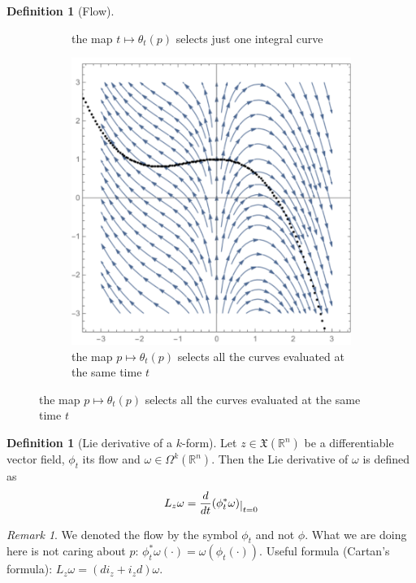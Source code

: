 \documentclass[a4paper,11pt,titlepage, article, oneside]{memoir}
\numberwithin{equation}{section}
\theoremstyle{definition}
\newtheorem{definition}[theorem]{Definition}
\theoremstyle{remark}
\newtheorem{remark}[theorem]{Remark}
\newcommand{\rfield}{\mathbb{R}}
\newcommand{\restrict}[2]{{#1}\raisebox{-.5ex}{$|$}_{#2}}
\begin{document}
\begin{definition}[Flow]
\begin{figure}[H]
\begin{subfigure}{.48\textwidth}
     \caption{the map $t \mapsto \theta_t(p)$ selects just one integral curve} \label{Fig:integralcurve_1}
\end{subfigure}
\begin{subfigure}{.48\textwidth}
     \centering
     \vspace{0.4em}
     \includegraphics[width=0.95\linewidth]{Images/integralcurve_2.pdf}
     \caption{the map $p \mapsto \theta_t(p)$ selects all the curves evaluated at the same time $t$} \label{Fig:integralcurve_2}
\end{subfigure}
\end{figure}
\end{definition}

\begin{definition}[Lie derivative of a $k$-form]
  Let $z \in \mathfrak{X}(\rfield^n)$ be a differentiable vector field, $\phi_t$ its flow and $\omega \in \Omega^k(\rfield^n)$. Then the Lie derivative of $\omega$ is defined as
  \begin{equation}
    L_z \omega = \restrict{\frac{d}{dt}(\phi_t^* \omega)}{t=0}
  \end{equation}
\end{definition}

\begin{remarkbox}\begin{remark}
  We denoted the flow by the symbol $\phi_t$ and not $\phi$. What we are doing here is not caring about $p$: $\phi^*_t \omega (\cdot) = \omega(\phi_t(\cdot))$.
  Useful formula (Cartan's formula): $L_z \omega = (d i_z + i_z d) \omega$.
\end{remark}\end{remarkbox}
\end{document}
